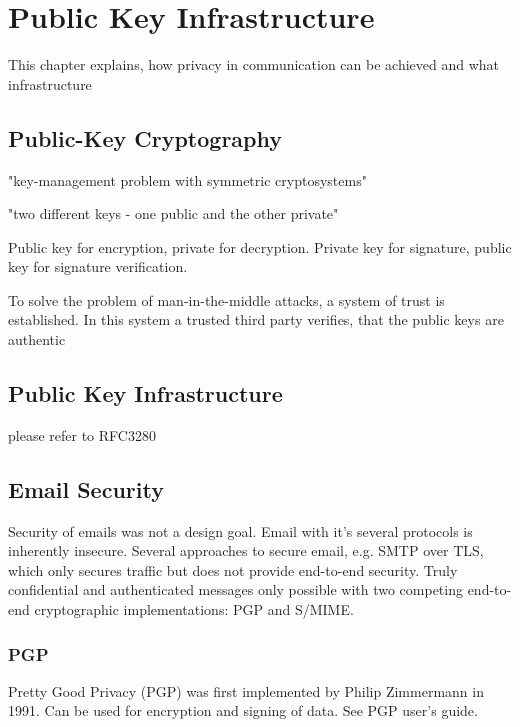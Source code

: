 \chapter{Public Key Infrastructure}\label{ch:publicKeyInfrastructure}

This chapter explains, how privacy in communication can be achieved and what infrastructure

\section{Public-Key Cryptography}\label{sec:publicKeyCryptography}

"key-management problem with symmetric cryptosystems"

"two different keys - one public and the other private"~\cite{schneier2007applied, diffie1976new}

Public key for encryption, private for decryption.
Private key for signature, public key for signature verification.

To solve the problem of man-in-the-middle attacks, a system of trust is established.
In this system a trusted third party verifies, that the public keys are authentic

\section{Public Key Infrastructure}\label{sec:publicKeyInfrastructure}
please refer to RFC3280

\section{Email Security}\label{sec:emailSecurity}

Security of emails was not a design goal.
Email with it's several protocols is inherently insecure.
Several approaches to secure email, e.g. SMTP over TLS, which only secures traffic but does not provide end-to-end
security.
Truly confidential and authenticated messages only possible with two competing end-to-end cryptographic implementations:
PGP and S/MIME.

\subsection{PGP}\label{subsec:pgp}

Pretty Good Privacy (PGP) was first implemented by Philip Zimmermann in 1991.
Can be used for encryption and signing of data.
See PGP user's guide.

